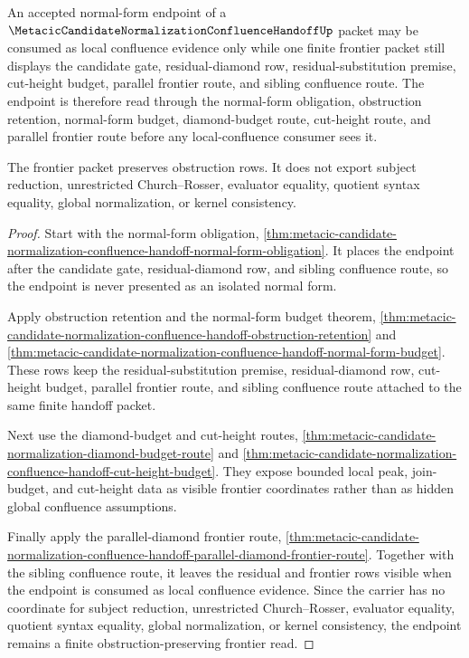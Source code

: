 \begin{theorem}
\label{thm:metacic-candidate-normalization-confluence-handoff-residual-normal-form-frontier}
An accepted normal-form endpoint of a
$\MetacicCandidateNormalizationConfluenceHandoffUp$ packet may be consumed as
local confluence evidence only while one finite frontier packet still displays
the candidate gate, residual-diamond row, residual-substitution premise,
cut-height budget, parallel frontier route, and sibling confluence route. The
endpoint is therefore read through the normal-form obligation, obstruction
retention, normal-form budget, diamond-budget route, cut-height route, and
parallel frontier route before any local-confluence consumer sees it.

The frontier packet preserves obstruction rows. It does not export subject
reduction, unrestricted Church--Rosser, evaluator equality, quotient syntax
equality, global normalization, or kernel consistency.
\end{theorem}
\begin{proof}
Start with the normal-form obligation,
\autoref{thm:metacic-candidate-normalization-confluence-handoff-normal-form-obligation}.
It places the endpoint after the candidate gate, residual-diamond row, and
sibling confluence route, so the endpoint is never presented as an isolated
normal form.

Apply obstruction retention and the normal-form budget theorem,
\autoref{thm:metacic-candidate-normalization-confluence-handoff-obstruction-retention}
and
\autoref{thm:metacic-candidate-normalization-confluence-handoff-normal-form-budget}.
These rows keep the residual-substitution premise, residual-diamond row,
cut-height budget, parallel frontier route, and sibling confluence route
attached to the same finite handoff packet.

Next use the diamond-budget and cut-height routes,
\autoref{thm:metacic-candidate-normalization-diamond-budget-route} and
\autoref{thm:metacic-candidate-normalization-confluence-handoff-cut-height-budget}.
They expose bounded local peak, join-budget, and cut-height data as visible
frontier coordinates rather than as hidden global confluence assumptions.

Finally apply the parallel-diamond frontier route,
\autoref{thm:metacic-candidate-normalization-confluence-handoff-parallel-diamond-frontier-route}.
Together with the sibling confluence route, it leaves the residual and frontier
rows visible when the endpoint is consumed as local confluence evidence. Since
the carrier has no coordinate for subject reduction, unrestricted
Church--Rosser, evaluator equality, quotient syntax equality, global
normalization, or kernel consistency, the endpoint remains a finite
obstruction-preserving frontier read.
\end{proof}


